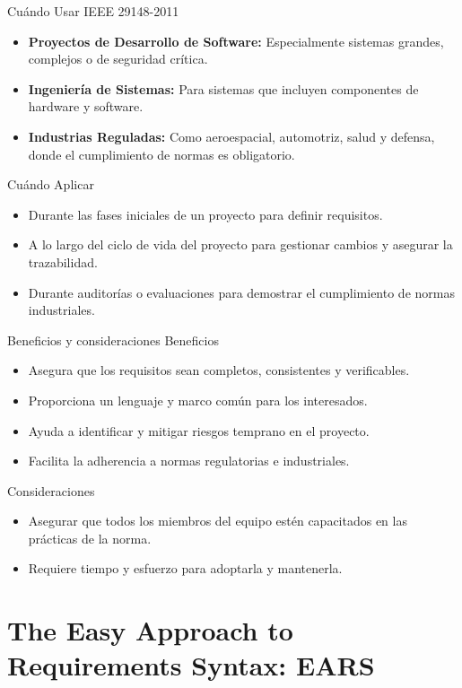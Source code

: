 \documentclass[
  24pt, %
  aspectratio=169, %
]{beamer}
\begin{document}
\begin{frame}{Cuándo Usar IEEE 29148-2011}
\begin{itemize}
    \item \textbf{Proyectos de Desarrollo de Software:} Especialmente sistemas grandes, complejos o de seguridad crítica.
    \item \textbf{Ingeniería de Sistemas:} Para sistemas que incluyen componentes de hardware y software.
    \item \textbf{Industrias Reguladas:} Como aeroespacial, automotriz, salud y defensa, donde el cumplimiento de normas es obligatorio.
\end{itemize}
\vspace{0.5cm}
Cuándo Aplicar
\begin{itemize}
    \item Durante las fases iniciales de un proyecto para definir requisitos.
    \item A lo largo del ciclo de vida del proyecto para gestionar cambios y asegurar la trazabilidad.
    \item Durante auditorías o evaluaciones para demostrar el cumplimiento de normas industriales.
\end{itemize}
\end{frame}

\begin{frame}{Beneficios y consideraciones}
Beneficios
\begin{itemize}
\item Asegura que los requisitos sean completos, consistentes y verificables.
\item Proporciona un lenguaje y marco común para los interesados.
\item Ayuda a identificar y mitigar riesgos temprano en el proyecto.
\item Facilita la adherencia a normas regulatorias e industriales.
\end{itemize}
Consideraciones
\begin{itemize}
\item Asegurar que todos los miembros del equipo estén capacitados en las prácticas de la norma.
\item Requiere tiempo y esfuerzo para adoptarla y mantenerla.
\end{itemize}
\end{frame}

\section{The Easy Approach to Requirements Syntax: EARS}
\end{document}
